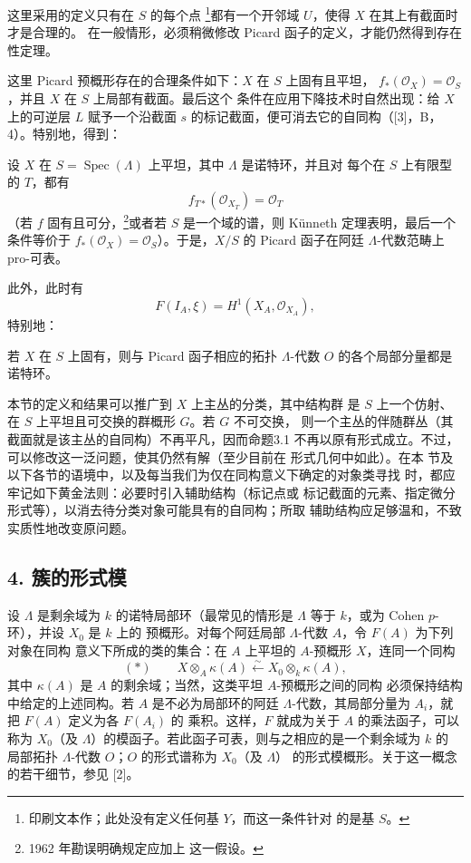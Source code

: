  这里采用的定义只有在 $S$ 的每个点
\footnote{印刷文本作；此处没有定义任何基 $Y$，而这一条件针对
的是基 $S$。}都有一个开邻域 $U$，使得 $X$ 在其上有截面时才是合理的。
在一般情形，必须稍微修改 Picard 函子的定义，才能仍然得到存在性定理。

这里 Picard 预概形存在的合理条件如下：$X$ 在 $S$ 上固有且平坦，
$f_*(\mathcal O_X)=\mathcal O_S$，并且 $X$ 在 $S$ 上局部有截面。最后这个
条件在应用下降技术时自然出现：给 $X$ 上的可逆层 $L$ 赋予一个沿截面 $s$
的标记截面，便可消去它的自同构（[3]，B，4）。特别地，得到：

 设 $X$ 在
$S=\operatorname{Spec}(\Lambda)$ 上平坦，其中 $\Lambda$ 是诺特环，并且对
每个在 $S$ 上有限型的 $T$，都有
\[
  f_{T*}(\mathcal O_{X_T})=\mathcal O_T
\]
（若 $f$ 固有且可分，\footnote{1962 年勘误明确规定应加上
这一假设。}或者若 $S$ 是一个域的谱，则 Künneth
定理表明，最后一个条件等价于
$f_*(\mathcal O_X)=\mathcal O_S$）。于是，$X/S$ 的 Picard 函子在阿廷
$\Lambda$-代数范畴上 pro-可表。

此外，此时有
\[
  F(I_A,\xi)=H^1(X_A,\mathcal O_{X_A}),
\]
特别地：

 若 $X$ 在 $S$ 上固有，则与 Picard 函子相应的拓扑
$\Lambda$-代数 $O$ 的各个局部分量都是诺特环。

 本节的定义和结果可以推广到 $X$ 上主丛的分类，其中结构群
是 $S$ 上一个仿射、在 $S$ 上平坦且可交换的群概形 $G$。若 $G$ 不可交换，
则一个主丛的伴随群丛（其截面就是该主丛的自同构）不再平凡，因而命题3.1
不再以原有形式成立。不过，可以修改这一泛问题，使其仍然有解（至少目前在
形式几何中如此）。在本
节及以下各节的语境中，以及每当我们为仅在同构意义下确定的对象类寻找
时，都应牢记如下黄金法则：必要时引入辅助结构（标记点或
标记截面的元素、指定微分形式等），以消去待分类对象可能具有的自同构；所取
辅助结构应足够温和，不致实质性地改变原问题。

\subsection*{4. 簇的形式模}

设 $\Lambda$ 是剩余域为 $k$ 的诺特局部环（最常见的情形是
$\Lambda$ 等于 $k$，或为 Cohen $p$-环），并设 $X_0$ 是 $k$ 上的
预概形。对每个阿廷局部 $\Lambda$-代数 $A$，令 $F(A)$ 为下列对象在同构
意义下所成的类的集合：在 $A$ 上平坦的 $A$-预概形 $X$，连同一个同构
\[
  (*)\qquad
  X\otimes_A\kappa(A)\xleftarrow{\sim}
  X_0\otimes_k\kappa(A),
\]
其中 $\kappa(A)$ 是 $A$ 的剩余域；当然，这类平坦 $A$-预概形之间的同构
必须保持结构中给定的上述同构。若 $A$ 是不必为局部环的阿廷
$\Lambda$-代数，其局部分量为 $A_i$，就把 $F(A)$ 定义为各 $F(A_i)$ 的
乘积。这样，$F$ 就成为关于 $A$ 的乘法函子，可以称为 $X_0$（及
$\Lambda$）的模函子。若此函子可表，则与之相应的是一个剩余域为 $k$ 的
局部拓扑 $\Lambda$-代数 $O$；$O$ 的形式谱称为 $X_0$（及 $\Lambda$）
的形式模概形。关于这一概念的若干细节，参见 [2]。

